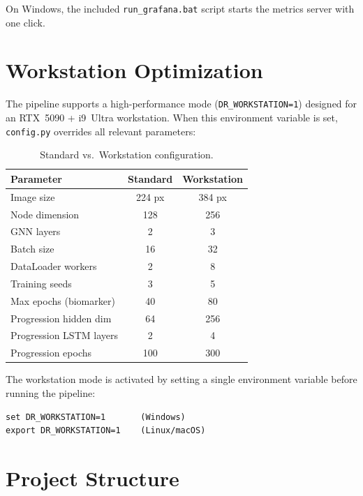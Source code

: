 \documentclass[12pt,a4paper]{article}
\begin{document}
On Windows, the included \texttt{run\_grafana.bat} script starts the metrics server with one click.

\section{Workstation Optimization}

The pipeline supports a high-performance mode (\texttt{DR\_WORKSTATION=1}) designed for an RTX~5090 + i9~Ultra workstation. When this environment variable is set, \texttt{config.py} overrides all relevant parameters:

\begin{table}[H]
\centering
\caption{Standard vs.\ Workstation configuration.}
\begin{tabular}{@{}lcc@{}}
\toprule
\textbf{Parameter} & \textbf{Standard} & \textbf{Workstation} \\
\midrule
Image size & 224 px & 384 px \\
Node dimension & 128 & 256 \\
GNN layers & 2 & 3 \\
Batch size & 16 & 32 \\
DataLoader workers & 2 & 8 \\
Training seeds & 3 & 5 \\
Max epochs (biomarker) & 40 & 80 \\
Progression hidden dim & 64 & 256 \\
Progression LSTM layers & 2 & 4 \\
Progression epochs & 100 & 300 \\
\bottomrule
\end{tabular}
\end{table}

The workstation mode is activated by setting a single environment variable before running the pipeline:
\begin{lstlisting}
set DR_WORKSTATION=1       (Windows)
export DR_WORKSTATION=1    (Linux/macOS)
\end{lstlisting}

\section{Project Structure}
\end{document}
